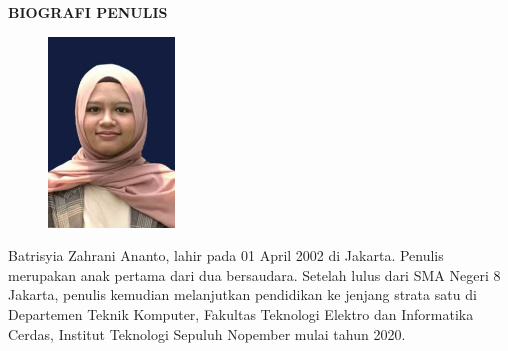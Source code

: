 \begin{center}
  \Large
  \textbf{BIOGRAFI PENULIS}
\end{center}


\vspace{2ex}

\begin{figure}
  \centering
  \vspace{-3ex}
  \includegraphics[width=0.3\textwidth]{gambar/Batrisyia Zahrani Ananto 5024201065 4 x 6.jpg}
  \vspace{-4ex}
\end{figure}

Batrisyia Zahrani Ananto, lahir pada 01 April 2002 di Jakarta. Penulis merupakan anak pertama dari dua bersaudara. Setelah lulus dari SMA Negeri 8 Jakarta, penulis kemudian melanjutkan pendidikan ke jenjang strata satu di Departemen Teknik Komputer, Fakultas Teknologi Elektro dan Informatika Cerdas, Institut Teknologi Sepuluh Nopember mulai tahun 2020.
